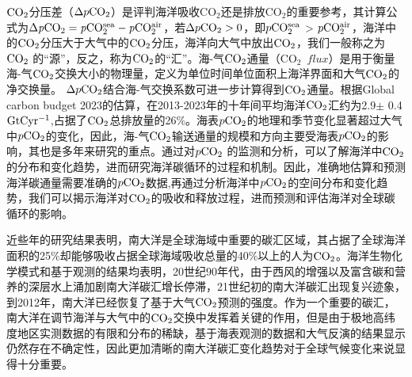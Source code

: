 $\rm CO_2$分压差（$\Delta p\rm CO_2$）是评判海洋吸收$\mathrm{CO_2}$还是排放$\mathrm{CO_2}$的重要参考，其计算公式为$\Delta \mathit{p}\rm{CO_2} = \mathit{p}\rm{CO_2^{sea}} - \mathit{p}\rm{CO_2^{air}}$，若$\Delta p \rm{CO_2}>0 $，即$p\rm CO_2^{sea}$ > $p\rm CO_2^{air}$，海洋中的$\rm CO_2$分压大于大气中的$\rm CO_2$分压，海洋向大气中放出$\rm CO_2$，我们一般称之为$\rm CO_2$ 的“源”，反之，称为$\rm CO_2$的“汇”。海-气$\rm CO_2$通量（$\mathrm{CO_2}$\ $flux$）是用于衡量海-气$\rm CO_2$交换大小的物理量，定义为单位时间单位面积上海洋界面和大气$\rm CO_2$的净交换量。 $\Delta p \rm CO_2$结合海-气交换系数可进一步计算得到$\rm CO_2$通量。根据Global carbon budget 2023的估算\cite{budget2023global}，在2013-2023年的十年间平均海洋$\rm CO_2$汇约为2.9$\pm$ 0.4$\rm GtC yr^{-1}$,占据了$\rm CO_2$总排放量的26\%\cite{budget2023global}。海表$p\rm CO_2$的地理和季节变化显著超过大气中$p\rm CO_2$的变化，因此，海-气$\rm CO_2$输送通量的规模和方向主要受海表$p\rm CO_2$的影响，其也是多年来研究的重点。通过对$p\rm CO_2$ 的监测和分析，可以了解海洋中$\rm CO_2$的分布和变化趋势，进而研究海洋碳循环的过程和机制。因此，准确地估算和预测海洋碳通量需要准确的$p\rm CO_2$数据,再通过分析海洋中$p\rm CO_2$的空间分布和变化趋势，我们可以揭示海洋对$\rm CO_2$的吸收和释放过程，进而预测和评估海洋对全球碳循环的影响。

近些年的研究结果表明\cite{khatiwala2009reconstruction,devries2014oceanic}，南大洋是全球海域中重要的碳汇区域，其占据了全球海洋面积的25\%却能够吸收占据全球海域吸收总量的40\%以上的人为$\rm CO_2$。海洋生物化学模式和基于观测的结果\cite{hauck2013seasonally}均表明，20世纪90年代，由于西风的增强以及富含碳和营养的深层水上涌加剧南大洋碳汇增长停滞，21世纪初的南大洋碳汇出现复兴迹象，到2012年，南大洋已经恢复了基于大气$\rm CO_2$预测的强度\cite{landschutzer2015reinvigoration}。作为一个重要的碳汇，南大洋在调节海洋与大气中的$\rm CO_2$交换中发挥着关键的作用，但是由于极地高纬度地区实测数据的有限和分布的稀缺，基于海表观测的数据和大气反演的结果显示仍然存在不确定性\cite{Global_Carbon_Budget_2022}，因此更加清晰的南大洋碳汇变化趋势对于全球气候变化来说显得十分重要。

